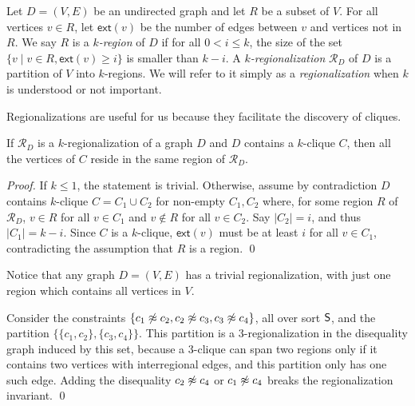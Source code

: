 \documentclass{svjour3}                     %
\begin{document}
\begin{definition}[$k$-Region]
\label{def:region}
Let $D = (V, E)$ be an undirected graph and let $R$ be a subset of $V$.
For all vertices $v \in R$, let $\mathsf{ext}(v)$ be the number of edges between $v$ and vertices not in $R$.
We say $R$ is a \emph{$k$-region} of $D$ if for all $0 < i \leq k$,
the size of the set $\{ v \mid v \in R, \mathsf{ext}(v) \ge i \}$ is smaller than $k-i$. 
A \emph{$k$-regionalization} $\mathcal{R}_D$ of $D$ is a partition of $V$ into $k$-regions.
We will refer to it simply as a \emph{regionalization} when $k$ is understood or not important.
\end{definition}

Regionalizations are useful for us because they facilitate the discovery of cliques.

\begin{lem}
If $\mathcal{R}_D$ is a $k$-regionalization of a graph $D$ and 
$D$ contains a $k$-clique $C$,
then all the vertices of $C$ reside in the same region of $\mathcal{R}_D$.
\end{lem}
\begin{proof}
If $k \leq 1$, the statement is trivial.
Otherwise, assume by contradiction $D$ contains $k$-clique $C = C_1 \cup C_2$ 
for non-empty $C_1, C_2$ where, for some region $R$ of $\mathcal{R}_D$, 
$v \in R$ for all $v \in C_1$ and $v \not\in R$ for all $v \in C_2$.
Say $\vert C_2 \vert = i$, and thus $\vert C_1 \vert = k-i$.
Since $C$ is a $k$-clique, $\mathsf{ext}(v)$ must be at least $i$ for all $v \in C_1$,
contradicting the assumption that $R$ is a region.
\qed
\end{proof}
\medskip

Notice that any graph $D = (V, E)$ has a trivial regionalization, 
with just one region which contains all vertices in $V$.

\begin{example}
Consider the constraints 
$\{ c_1 \not\approx c_2, c_2 \not\approx c_3, c_3 \not\approx c_4 \}$,
all over sort $\mathsf{S}$, and the partition $\{ \{ c_1, c_2 \}, \{ c_3, c_4 \} \}$.
This partition is a 3-regionalization in the disequality graph induced by this set,
because a 3-clique can span two regions only if it contains two vertices with interregional edges,
and this partition only has one such edge.
Adding the disequality $c_2 \not\approx c_4$ or $c_1 \not\approx c_4$
breaks the regionalization invariant.
\qed
\end{example}
\end{document}
